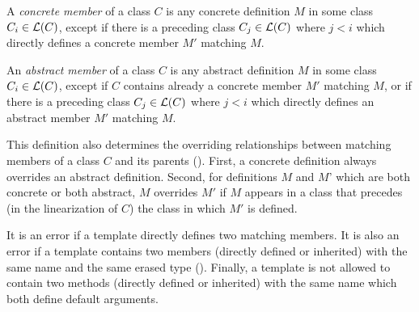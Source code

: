 \begin{definition}\label{def:member}
A {\em concrete member} of a class $C$ is any concrete definition $M$ in
some class $C_i \in {\cal L}(C)$, except if there is a preceding class $C_j
\in {\cal L}(C)$ where $j < i$ which directly defines a concrete member $M'$ matching $M$.  

An {\em abstract member} of a class $C$ is any abstract definition $M$
in some class $C_i \in {\cal L}(C)$, except if $C$ contains already a
concrete member $M'$ matching $M$, or if there is a preceding class
$C_j \in {\cal L}(C)$ where $j < i$ which directly defines an abstract member $M'$ matching
$M$.
\end{definition}
This definition also determines the overriding relationships between
matching members of a class $C$ and its parents ().  
First, a concrete definition always overrides an abstract definition.  Second, for
definitions $M$ and $M$' which are both concrete or both abstract, $M$
overrides $M'$ if $M$ appears in a class that precedes (in the
linearization of $C$) the class in which $M'$ is defined.

It is an error if a template directly defines two matching members. It
is also an error if a template contains two members (directly defined
or inherited) with the same name and the same erased type ().
Finally, a template is not allowed to contain two methods (directly
defined or inherited) with the same name which both define default arguments.


